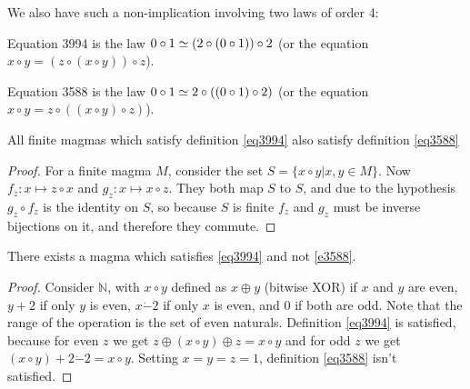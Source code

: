 We also have such a non-implication involving two laws of order $4$:
\begin{definition}[Equation 3994]
  \label{eq3994}
  Equation 3994 is the law $0 \circ 1 \simeq (2 \circ (0 \circ 1)) \circ 2$ (or the equation $x \circ y = (z \circ (x \circ y)) \circ z$).
\end{definition}

\begin{definition}[Equation 3588]
  \label{eq3588}
  Equation 3588 is the law $0 \circ 1 \simeq 2 \circ ((0 \circ 1) \circ 2)$ (or the equation $x \circ y = z \circ ((x \circ y) \circ z)$).
\end{definition}

\begin{theorem}\label{finite_imp_3994_3588_thm}
  \leanok
  All finite magmas which satisfy definition \ref{eq3994} also satisfy definition \ref{eq3588}
\end{theorem}

\begin{proof}\label{finite_imp_3994_3588} \leanok
  For a finite magma $M$, consider the set $S = \{x \circ y | x, y \in M\}$.
  Now $f_z : x \mapsto z \circ x$ and $g_z : x \mapsto x \circ z$.
  They both map $S$ to $S$, and due to the hypothesis $g_z \circ f_z$ is the identity on $S$,
  so because $S$ is finite $f_z$ and $g_z$ must be inverse bijections on it, and therefore
  they commute.
\end{proof}

\begin{theorem}\label{non_imp_3994_3588_thm}
  \leanok
  There exists a magma which satisfies \ref{eq3994} and not \ref{e3588}.
\end{theorem}

\begin{proof} \leanok
  Consider $\mathbb{N}$, with $x \circ y$ defined as $x \oplus y$ (bitwise XOR) if $x$ and $y$ are even,
  $y+2$ if only $y$ is even, $x \dot - 2$ if only $x$ is even, and $0$ if both are odd.
  Note that the range of the operation is the set of even naturals.
  Definition \ref{eq3994} is satisfied, because for even $z$ we get $z \oplus (x \circ y) \oplus z = x \circ y$
  and for odd $z$ we get $(x \circ y) + 2 \dot - 2 = x \circ y$.
  Setting $x = y = z = 1$, definition \ref{eq3588} isn't satisfied.
\end{proof}
